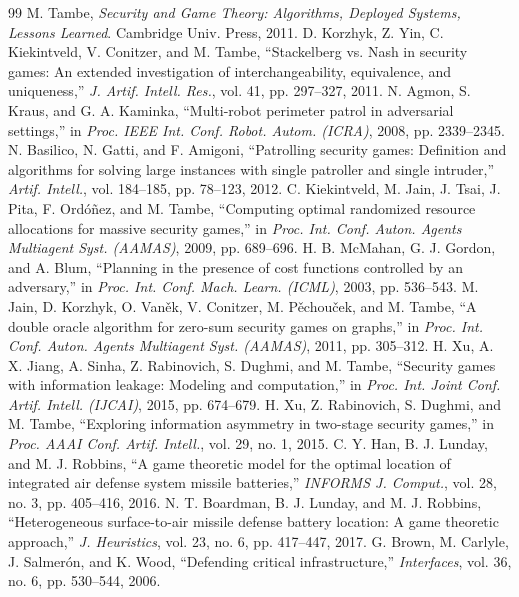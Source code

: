 \documentclass[letterpaper,journal]{IEEEtran}
\theoremstyle{remark}
\begin{document}
\small
\begin{thebibliography}{99}
 M. Tambe, \emph{Security and Game Theory: Algorithms, Deployed Systems, Lessons Learned}. Cambridge Univ. Press, 2011.
 D. Korzhyk, Z. Yin, C. Kiekintveld, V. Conitzer, and M. Tambe, ``Stackelberg vs. Nash in security games: An extended investigation of interchangeability, equivalence, and uniqueness,'' \emph{J. Artif. Intell. Res.}, vol. 41, pp. 297--327, 2011.
 N. Agmon, S. Kraus, and G. A. Kaminka, ``Multi-robot perimeter patrol in adversarial settings,'' in \emph{Proc. IEEE Int. Conf. Robot. Autom. (ICRA)}, 2008, pp. 2339--2345.
 N. Basilico, N. Gatti, and F. Amigoni, ``Patrolling security games: Definition and algorithms for solving large instances with single patroller and single intruder,'' \emph{Artif. Intell.}, vol. 184--185, pp. 78--123, 2012.
 C. Kiekintveld, M. Jain, J. Tsai, J. Pita, F. Ord\'o\~nez, and M. Tambe, ``Computing optimal randomized resource allocations for massive security games,'' in \emph{Proc. Int. Conf. Auton. Agents Multiagent Syst. (AAMAS)}, 2009, pp. 689--696.
 H. B. McMahan, G. J. Gordon, and A. Blum, ``Planning in the presence of cost functions controlled by an adversary,'' in \emph{Proc. Int. Conf. Mach. Learn. (ICML)}, 2003, pp. 536--543.
 M. Jain, D. Korzhyk, O. Van\v{e}k, V. Conitzer, M. P\v{e}chou\v{c}ek, and M. Tambe, ``A double oracle algorithm for zero-sum security games on graphs,'' in \emph{Proc. Int. Conf. Auton. Agents Multiagent Syst. (AAMAS)}, 2011, pp. 305--312.
 H. Xu, A. X. Jiang, A. Sinha, Z. Rabinovich, S. Dughmi, and M. Tambe, ``Security games with information leakage: Modeling and computation,'' in \emph{Proc. Int. Joint Conf. Artif. Intell. (IJCAI)}, 2015, pp. 674--679.
 H. Xu, Z. Rabinovich, S. Dughmi, and M. Tambe, ``Exploring information asymmetry in two-stage security games,'' in \emph{Proc. AAAI Conf. Artif. Intell.}, vol. 29, no. 1, 2015.
 C. Y. Han, B. J. Lunday, and M. J. Robbins, ``A game theoretic model for the optimal location of integrated air defense system missile batteries,'' \emph{INFORMS J. Comput.}, vol. 28, no. 3, pp. 405--416, 2016.
 N. T. Boardman, B. J. Lunday, and M. J. Robbins, ``Heterogeneous surface-to-air missile defense battery location: A game theoretic approach,'' \emph{J. Heuristics}, vol. 23, no. 6, pp. 417--447, 2017.
 G. Brown, M. Carlyle, J. Salmer\'on, and K. Wood, ``Defending critical infrastructure,'' \emph{Interfaces}, vol. 36, no. 6, pp. 530--544, 2006.

\end{thebibliography}
\end{document}
